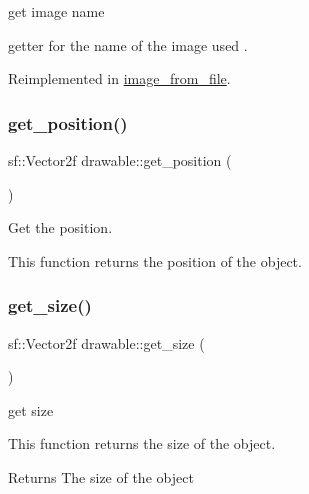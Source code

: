 get image name 

getter for the name of the image used . 

Reimplemented in \hyperlink{classimage__from__file_adb7af19d3d997ab5c0d5b7c8dfe32ded}{image\+\_\+from\+\_\+file}.

\mbox{\label{classdrawable_a6a31ea381be2964d0115b782a66d3414}} 
\subsubsection{\texorpdfstring{get\+\_\+position()}{get\_position()}}
{\footnotesize\ttfamily sf\+::\+Vector2f drawable\+::get\+\_\+position (\begin{DoxyParamCaption}{ }\end{DoxyParamCaption})\hspace{0.3cm}{\ttfamily [virtual]}}



Get the position. 

This function returns the position of the object. \mbox{\label{classdrawable_a58cb3ab0406d40e9cea3aefac1e4bf05}} 
\subsubsection{\texorpdfstring{get\+\_\+size()}{get\_size()}}
{\footnotesize\ttfamily sf\+::\+Vector2f drawable\+::get\+\_\+size (\begin{DoxyParamCaption}{ }\end{DoxyParamCaption})\hspace{0.3cm}{\ttfamily [virtual]}}



get size 

This function returns the size of the object.

\begin{DoxyReturn}{Returns}
The size of the object 
\end{DoxyReturn}
\mbox{\label{classdrawable_a329e564296d591dc8bd2f6dc5a205213}} 
